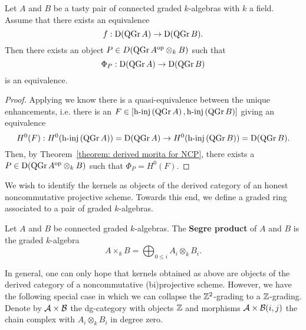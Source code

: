 \begin{corollary} \label{corollary: NCP morita}
  Let \(A\) and \(B\) be a tasty pair of connected graded \(k\)-algebras with \(k\) a field. Assume that there exists an equivalence
  \begin{displaymath}
    f : \mathrm{D} (\operatorname{QGr}A) \to \mathrm{D} (\operatorname{QGr}B).
  \end{displaymath}
  Then there exists an object \(P \in D ( \operatorname{QGr}A^{\operatorname{op}} \otimes_k B )\) such that 
  \begin{displaymath}
    \Phi_P : \mathrm{D} ( \operatorname{QGr}A) \to \mathrm{D} (\operatorname{QGr}B )
  \end{displaymath}
  is an equivalence.
\end{corollary}

\begin{proof}
  Applying \parencite[Theorem 1]{Lunts-Orlov} we know there is a quasi-equivalence between the unique enhancements, i.e. there is an \( F \in [ \operatorname{h-inj}\left( \operatorname{QGr}A\right), \operatorname{h-inj}\left( \operatorname{QGr}B\right) ]\) giving an equivalence
  \begin{displaymath}
    H^0(F) : H^0(\operatorname{h-inj}\left( \operatorname{QGr}A \right)) = \mathrm{D}(\operatorname{QGr}A) \to H^0(\operatorname{h-inj}\left( \operatorname{QGr}B \right)) = \mathrm{D}(\operatorname{QGr}B).
  \end{displaymath}
  Then, by Theorem~\ref{theorem: derived morita for NCP}, there exists a \(P \in \mathrm{D}(\operatorname{QGr}A^{\operatorname{op}} \otimes_k B)\) such that \(\Phi_P = H^0(F)\). 
\end{proof}

We wish to identify the kernels as objects of the derived category of an honest noncommutative projective scheme.  Towards this end, we define a graded ring associated to a pair of graded \(k\)-algebras.
\begin{definition}\label{def: segre product}
  Let \(A\) and \(B\) be connected graded \(k\)-algebras.
  The \textbf{Segre product} of \(A\) and \(B\) is the graded \(k\)-algebra
  \[ A \times_k B = \bigoplus_{0 \leq i} A_i \otimes_k B_i.\]
\end{definition}

In general, one can only hope that kernels obtained as above are objects of the derived category of a noncommutative (bi)projective scheme.
However, we have the following special case in which we can collapse the \(\mathbb{Z}^2\)-grading to a \(\mathbb{Z}\)-grading.
Denote by \(\mathcal{A} \times \mathcal{B}\) the dg-category with objects \(\mathbb{Z}\) and morphisms \(\mathcal{A} \times \mathcal{B}(i,j)\) the chain complex with \(A_i \otimes_k B_i\) in degree zero.

